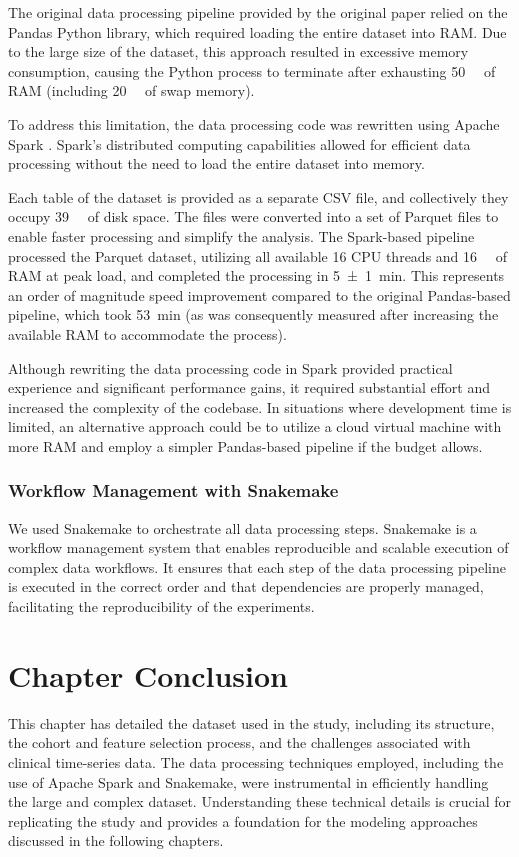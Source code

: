 The original data processing pipeline provided by the original paper relied on the Pandas Python library, which required loading the entire dataset into RAM. Due to the large size of the dataset, this approach resulted in excessive memory consumption, causing the Python process to terminate after exhausting \qty{50}{\giga\byte} of RAM (including \qty{20}{\giga\byte} of swap memory).

To address this limitation, the data processing code was rewritten using Apache Spark \cite{ApacheSpark}. Spark's distributed computing capabilities allowed for efficient data processing without the need to load the entire dataset into memory.

Each table of the dataset is provided as a separate CSV file, and collectively they occupy  \qty{39}{\giga\byte} of disk space. The files were converted into a set of Parquet files to enable faster processing and simplify the analysis. The Spark-based pipeline processed the Parquet dataset, utilizing all available \num{16} CPU threads and \qty{16}{\giga\byte} of RAM at peak load, and completed the processing in \qty{5(1)}{\minute}. This represents an order of magnitude speed improvement compared to the original Pandas-based pipeline, which took \qty{53}{\minute} (as was consequently measured after increasing the available RAM to accommodate the process).

Although rewriting the data processing code in Spark provided practical experience and significant performance gains, it required substantial effort and increased the complexity of the codebase. In situations where development time is limited, an alternative approach could be to utilize a cloud virtual machine with more RAM and employ a simpler Pandas-based pipeline if the budget allows.

\subsubsection{Workflow Management with Snakemake}

We used Snakemake to orchestrate all data processing steps. Snakemake is a workflow management system that enables reproducible and scalable execution of complex data workflows. It ensures that each step of the data processing pipeline is executed in the correct order and that dependencies are properly managed, facilitating the reproducibility of the experiments.

\section{Chapter Conclusion}

This chapter has detailed the dataset used in the study, including its structure, the cohort and feature selection process, and the challenges associated with clinical time-series data. The data processing techniques employed, including the use of Apache Spark and Snakemake, were instrumental in efficiently handling the large and complex dataset. Understanding these technical details is crucial for replicating the study and provides a foundation for the modeling approaches discussed in the following chapters.

